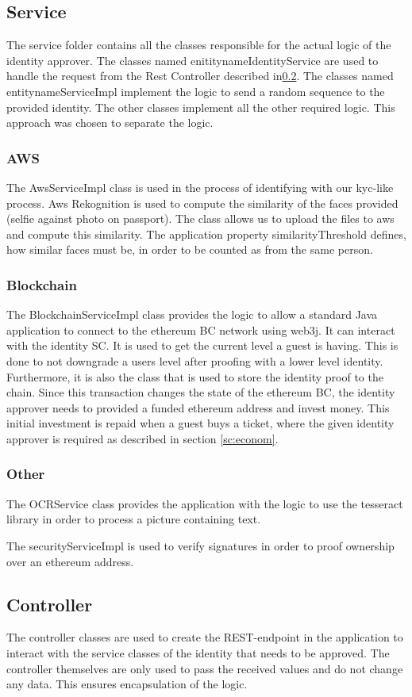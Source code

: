 \subsection{Service}
The service folder contains all the classes responsible for the actual logic of the identity approver. The classes named enititynameIdentityService are used to handle the request from the Rest Controller described in\ref{sec:controller}. The classes named entitynameServiceImpl implement the logic to send a random sequence to the provided identity.
The other classes implement all the other required logic. This approach was chosen to separate the logic. 

\subsubsection{AWS}
The AwsServiceImpl class is used in the process of identifying with our kyc-like process. Aws Rekognition is used to compute the similarity of the faces provided (selfie against photo on passport). The class allows us to upload the files to aws and compute this similarity. The application property similarityThreshold defines, how similar faces must be, in order to be counted as from the same person.

\subsubsection{Blockchain}
The BlockchainServiceImpl class provides the logic to allow a standard Java application to connect to the ethereum BC network using web3j. It can interact with the identity SC. It is used to get the current level a guest is having. This is done to not downgrade a users level after proofing with a lower level identity. Furthermore, it is also the class that is used to store the identity proof to the chain. Since this transaction changes the state of the ethereum BC, the identity approver needs to provided a funded ethereum address and invest money. This initial investment is repaid when a guest buys a ticket, where the given identity approver is required as described in section \ref{sc:econom}.

\subsubsection{Other}
The OCRService class provides the application with the logic to use the tesseract library in order to process a picture containing text. 

The securityServiceImpl is used to verify signatures in order to proof ownership over an ethereum address.


\subsection{Controller}\label{sec:controller}
The controller classes are used to create the REST-endpoint in the application to interact with the service classes of the identity that needs to be approved. The controller themselves are only used to pass the received values and do not change any data. This ensures encapsulation of the logic.

